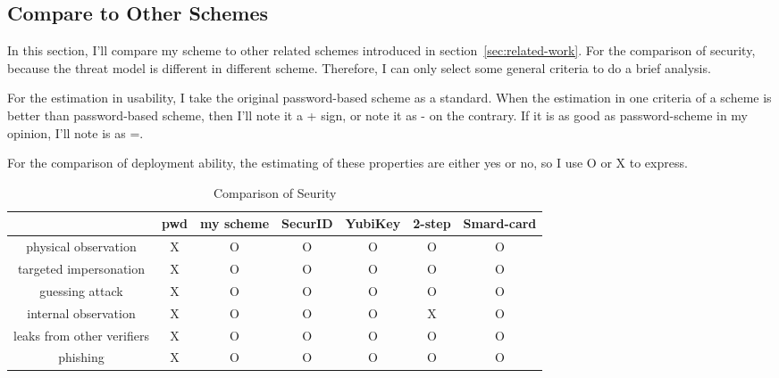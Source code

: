\begin{CJK}{Bg5}{bsmi}


\chapter{Compare to Other Schemes}

In this section, I'll compare my scheme to other related schemes introduced in section~\ref{sec:related-work}. For the comparison of security, because the threat model is different in different scheme. Therefore, I can only select some general criteria to do a brief analysis. 

For the estimation in usability, I take the original password-based scheme as a standard. When the estimation in one criteria of a scheme is better than password-based scheme, then I'll note it a + sign, or note it as - on the contrary. If it is as good as password-scheme in my opinion, I'll note is as =. 

For the comparison of deployment ability, the estimating of these properties are either yes or no, so I use O or X to express.

\begin{table}[h]
\begin{tabular}{|c|c|c|c|c|c|c|}
\hline
                           & pwd & my scheme & SecurID & YubiKey & 2-step & Smard-card \\ \hline
physical observation       & X   & O         & O       & O       & O       & O          \\ \hline
targeted impersonation     & X   & O         & O       & O       & O       & O          \\ \hline
guessing attack            & X   & O         & O       & O       & O       & O          \\ \hline
internal observation       & X   & O         & O       & O       & X       & O          \\ \hline
leaks from other verifiers & X   & O         & O       & O       & O       & O          \\ \hline
phishing                   & X   & O         & O       & O       & O       & O          \\ \hline
\end{tabular}
\caption{Comparison of Seurity}
\end{table}


\end{CJK}
